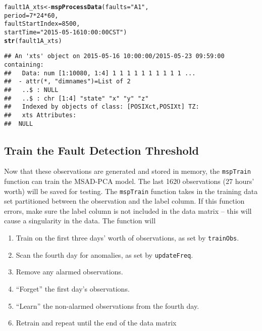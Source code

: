 \documentclass{report}\usepackage[]{graphicx}\usepackage[]{color}
\makeatletter
\newcommand{\hlnum}[1]{\textcolor[rgb]{0.686,0.059,0.569}{#1}}%
\newcommand{\hlstr}[1]{\textcolor[rgb]{0.192,0.494,0.8}{#1}}%
\newcommand{\hlopt}[1]{\textcolor[rgb]{0,0,0}{#1}}%
\newcommand{\hlstd}[1]{\textcolor[rgb]{0.345,0.345,0.345}{#1}}%
\newcommand{\hlkwb}[1]{\textcolor[rgb]{0.69,0.353,0.396}{#1}}%
\newcommand{\hlkwc}[1]{\textcolor[rgb]{0.333,0.667,0.333}{#1}}%
\newcommand{\hlkwd}[1]{\textcolor[rgb]{0.737,0.353,0.396}{\textbf{#1}}}%
\newenvironment{kframe}{%
 \def\at@end@of@kframe{}%
 \ifinner\ifhmode%
  \def\at@end@of@kframe{\end{minipage}}%
  \begin{minipage}{\columnwidth}%
 \fi\fi%
 \def\FrameCommand##1{\hskip\@totalleftmargin \hskip-\fboxsep
 \colorbox{shadecolor}{##1}\hskip-\fboxsep
     \hskip-\linewidth \hskip-\@totalleftmargin \hskip\columnwidth}%
 \MakeFramed {\advance\hsize-\width
   \@totalleftmargin\z@ \linewidth\hsize
   \@setminipage}}%
 {\par\unskip\endMakeFramed%
 \at@end@of@kframe}
\newenvironment{knitrout}{}{} %
\makeatother
\begin{document}
\begin{knitrout}
\color{fgcolor}\begin{kframe}
\begin{alltt}
\hlstd{fault1A_xts} \hlkwb{<-} \hlkwd{mspProcessData}\hlstd{(}\hlkwc{faults} \hlstd{=} \hlstr{"A1"}\hlstd{,}
                              \hlkwc{period} \hlstd{=} \hlnum{7} \hlopt{*} \hlnum{24} \hlopt{*} \hlnum{60}\hlstd{,}
                              \hlkwc{faultStartIndex} \hlstd{=} \hlnum{8500}\hlstd{,}
                              \hlkwc{startTime} \hlstd{=} \hlstr{"2015-05-16 10:00:00 CST"}\hlstd{)}
\hlkwd{str}\hlstd{(fault1A_xts)}
\end{alltt}
\begin{verbatim}
## An 'xts' object on 2015-05-16 10:00:00/2015-05-23 09:59:00 containing:
##   Data: num [1:10080, 1:4] 1 1 1 1 1 1 1 1 1 1 ...
##  - attr(*, "dimnames")=List of 2
##   ..$ : NULL
##   ..$ : chr [1:4] "state" "x" "y" "z"
##   Indexed by objects of class: [POSIXct,POSIXt] TZ: 
##   xts Attributes:  
##  NULL
\end{verbatim}
\end{kframe}
\end{knitrout}


\subsection{Train the Fault Detection Threshold}
Now that these observations are generated and stored in memory, the \texttt{mspTrain} function can train the MSAD-PCA model. The last 1620 observations (27 hours' worth) will be saved for testing. The \texttt{mspTrain} function takes in the training data set partitioned between the observation and the label column. If this function errors, make sure the label column is not included in the data matrix -- this will cause a singularity in the data. The function will
\begin{enumerate}
\item Train on the first three days' worth of observations, as set by \texttt{trainObs}.
%
\item Scan the fourth day for anomalies, as set by \texttt{updateFreq}.
%
\item Remove any alarmed observations.
%
\item ``Forget'' the first day's observations.
%
\item ``Learn'' the non-alarmed observations from the fourth day.
%
\item Retrain and repeat until the end of the data matrix
\end{enumerate}
\end{document}
